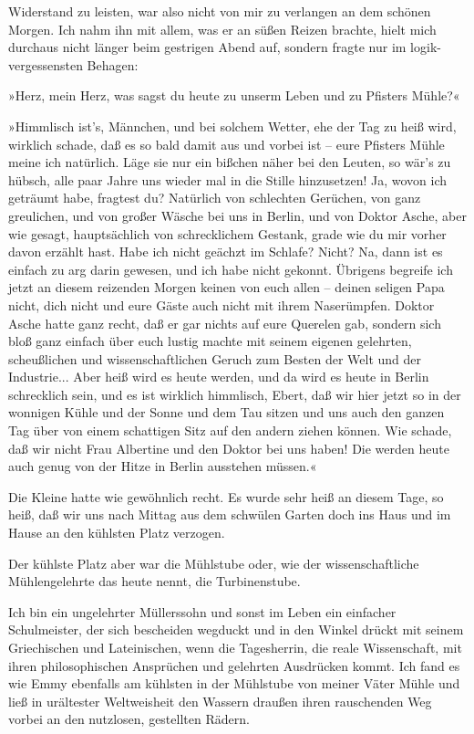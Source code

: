 Widerstand zu leisten, war also nicht von mir zu verlangen an dem
schönen Morgen. Ich nahm ihn mit allem, was er an süßen Reizen
brachte, hielt mich durchaus nicht länger beim gestrigen Abend auf,
sondern fragte nur im logik-vergessensten Behagen:

»Herz, mein Herz, was sagst du heute zu unserm Leben und zu
Pfisters Mühle?«

»Himmlisch ist's, Männchen, und bei solchem Wetter, ehe der Tag zu
heiß wird, wirklich schade, daß es so bald damit aus und vorbei ist
– eure Pfisters Mühle meine ich natürlich. Läge sie nur ein bißchen
näher bei den Leuten, so wär's zu hübsch, alle paar Jahre uns
wieder mal in die Stille hinzusetzen! Ja, wovon ich geträumt habe,
fragtest du? Natürlich von schlechten Gerüchen, von ganz
greulichen, und von großer Wäsche bei uns in Berlin, und von Doktor
Asche, aber wie gesagt, hauptsächlich von schrecklichem Gestank,
grade wie du mir vorher davon erzählt hast. Habe ich nicht geächzt
im Schlafe? Nicht? Na, dann ist es einfach zu arg darin gewesen,
und ich habe nicht gekonnt. Übrigens begreife ich jetzt an diesem
reizenden Morgen keinen von euch allen – deinen seligen Papa nicht,
dich nicht und eure Gäste auch nicht mit ihrem Naserümpfen. Doktor
Asche hatte ganz recht, daß er gar nichts auf eure Querelen gab,
sondern sich bloß ganz einfach über euch lustig machte mit seinem
eigenen gelehrten, scheußlichen und wissenschaftlichen Geruch zum
Besten der Welt und der Industrie... Aber heiß wird es heute
werden, und da wird es heute in Berlin schrecklich sein, und es ist
wirklich himmlisch, Ebert, daß wir hier jetzt so in der wonnigen
Kühle und der Sonne und dem Tau sitzen und uns auch den ganzen Tag
über von einem schattigen Sitz auf den andern ziehen können. Wie
schade, daß wir nicht Frau Albertine und den Doktor bei uns haben!
Die werden heute auch genug von der Hitze in Berlin ausstehen
müssen.«

Die Kleine hatte wie gewöhnlich recht. Es wurde sehr heiß an diesem
Tage, so heiß, daß wir uns nach Mittag aus dem schwülen Garten doch
ins Haus und im Hause an den kühlsten Platz verzogen.

Der kühlste Platz aber war die Mühlstube oder, wie der
wissenschaftliche Mühlengelehrte das heute nennt, die
Turbinenstube.

Ich bin ein ungelehrter Müllerssohn und sonst im Leben ein
einfacher Schulmeister, der sich bescheiden wegduckt und in den
Winkel drückt mit seinem Griechischen und Lateinischen, wenn die
Tagesherrin, die reale Wissenschaft, mit ihren philosophischen
Ansprüchen und gelehrten Ausdrücken kommt. Ich fand es wie Emmy
ebenfalls am kühlsten in der Mühlstube von meiner Väter Mühle und
ließ in urältester Weltweisheit den Wassern draußen ihren
rauschenden Weg vorbei an den nutzlosen, gestellten Rädern.


